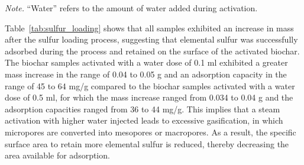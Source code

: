 \begin{table}[H]
\centering
\caption{Results of the sulfur loading process of the French biochar samples activated using water.}
\label{tab:sulfur_loading}

\renewcommand{\arraystretch}{1.5}
\setlength{\tabcolsep}{5pt}

\small


\vspace{2mm}

\begin{minipage}{\textwidth}
\footnotesize
\textit{Note.} ``Water'' refers to the amount of water added during activation.
\end{minipage}

\end{table}

Table~\ref{tab:sulfur_loading} shows that all samples exhibited an increase in mass after the sulfur loading process, suggesting that elemental sulfur was successfully adsorbed during the process and retained on the surface of the activated biochar. The biochar samples activated with a water dose of 0.1 ml exhibited a greater mass increase in the range of 0.04 to 0.05 g and an adsorption capacity in the range of 45 to 64 mg/g compared to the biochar samples activated with a water dose of 0.5 ml, for which the mass increase ranged from 0.034 to 0.04 g and the adsorption capacities ranged from 36 to 44 mg/g. This implies that a steam activation with higher water injected leads to excessive gasification, in which micropores are converted into mesopores or macropores. As a result, the specific surface area to retain more elemental sulfur is reduced, thereby decreasing the area available for adsorption. 

